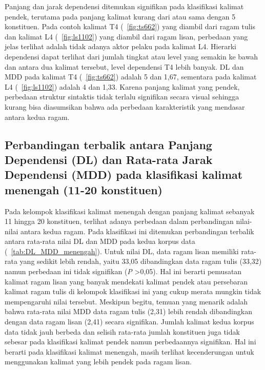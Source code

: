 Panjang dan jarak dependensi ditemukan signifikan pada klasifikasi kalimat pendek, terutama pada panjang kalimat kurang dari atau sama dengan 5 konstituen. Pada contoh kalimat T4 (\pic~\ref{fig:ts662}) yang diambil dari ragam tulis dan kalimat L4 (\pic~\ref{fig:ls1102}) yang diambil dari ragam lisan, perbedaan yang jelas terlihat adalah tidak adanya aktor pelaku pada kalimat L4. Hierarki dependensi dapat terlihat dari jumlah tingkat atau level yang semakin ke bawah dan antara dua kalimat tersebut, level dependensi T4 lebih banyak. DL dan MDD pada kalimat T4 (\pic~\ref{fig:ts662}) adalah 5 dan 1,67, sementara pada kalimat L4 (\pic~\ref{fig:ls1102}) adalah 4 dan 1,33. Karena panjang kalimat yang pendek, perbedaan struktur sintaktis tidak terlalu signifikan secara visual sehingga kurang bisa diasumsikan bahwa ada perbedaan karakteristik yang mendasar antara kedua ragam. 

\subsection{Perbandingan terbalik antara Panjang Dependensi (DL) dan Rata-rata Jarak Dependensi (MDD) pada klasifikasi kalimat menengah (11-20 konstituen)}
Pada kelompok klasifikasi kalimat menengah dengan panjang kalimat sebanyak 11 hingga 20 konstituen, terlihat adanya perbedaan dalam perbandingan nilai-nilai antara kedua ragam. Pada klasifikasi ini ditemukan perbandingan terbalik antara rata-rata nilai DL dan MDD pada kedua korpus data (\tab~\ref{tab:DL_MDD_menengah}). Untuk nilai DL, data ragam lisan memiliki rata-rata yang sedikit lebih rendah, yaitu 33,05 dibandingkan data ragam tulis (33,32) namun perbedaan ini tidak signifikan (\textit{P} \textgreater 0,05). Hal ini berarti pemusatan kalimat ragam lisan yang banyak mendekati kalimat pendek atau persebaran kalimat ragam tulis di kelompok klasifikasi ini yang cukup merata mungkin tidak mempengaruhi nilai tersebut. Meskipun begitu, temuan yang menarik adalah bahwa rata-rata nilai MDD data ragam tulis (2,31) lebih rendah dibandingkan dengan data ragam lisan (2,41) secara signifikan. Jumlah kalimat kedua korpus data tidak jauh berbeda dan selisih rata-rata jumlah konstituen juga tidak sebesar pada klasifikasi kalimat pendek namun perbedaannya signifikan. Hal ini berarti pada klasifikasi kalimat menengah, masih terlihat kecenderungan untuk menggunakan kalimat yang lebih pendek pada ragam lisan.  


